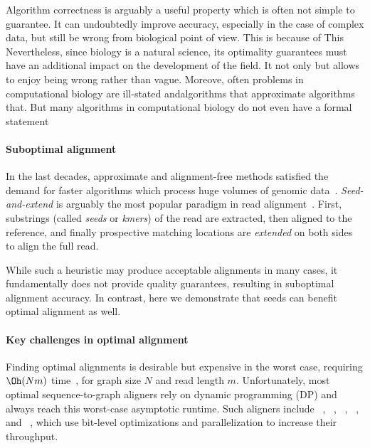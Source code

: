 Algorithm correctness is arguably a useful property which is often not simple to
guarantee. It can undoubtedly improve accuracy, especially in the case of
complex data, but still be wrong from biological point of view. This is because
of  This Nevertheless, since biology is a natural science, its  optimality
guarantees must have an additional impact on the development of the field. It
not only but allows to enjoy being wrong rather than vague. Moreove, often
problems in computational biology are ill-stated andalgorithms that approximate
algorithms that. But many algorithms in computational biology do not even have a
formal statement 

\paragraph{Suboptimal alignment}
%
In the last decades, approximate and alignment-free methods satisfied the demand
for faster algorithms which process huge volumes of genomic
data~\citep{kucherov2019evolution}. 
%
\emph{Seed-and-extend} is arguably the most popular paradigm in read
alignment~\citep{altschul_basic_1990,langmead_fast_2012,li_fast_2009}. First,
substrings (called \emph{seeds} or \emph{kmers}) of the read are extracted, then
aligned to the reference, and finally prospective matching locations are
\emph{extended} on both sides to align the full read.

While such a heuristic may produce acceptable alignments in many cases, it
fundamentally does not provide quality guarantees, resulting in suboptimal
alignment accuracy.
%
In contrast, here we demonstrate that seeds can benefit optimal alignment as
well.

\paragraph{Key challenges in optimal alignment}
%
Finding optimal alignments is desirable but expensive in the worst case,
requiring $\Oh(Nm)$ time~\citep{equi2019complexity}, for graph size $N$ and read
length $m$.
%
Unfortunately, most optimal sequence-to-graph aligners rely on dynamic
programming (DP) and always reach this worst-case asymptotic runtime. Such
aligners include \vargas~\citep{darby2020vargas},
\pasgal~\citep{jain_accelerating_2019},
\graphaligner~\citep{rautiainen_bitparallel_2019},
\hga~\citep{feng2021accelerating}, and \vg~\citep{garrison_variation_2018},
which use bit-level optimizations and parallelization to increase their
throughput.

